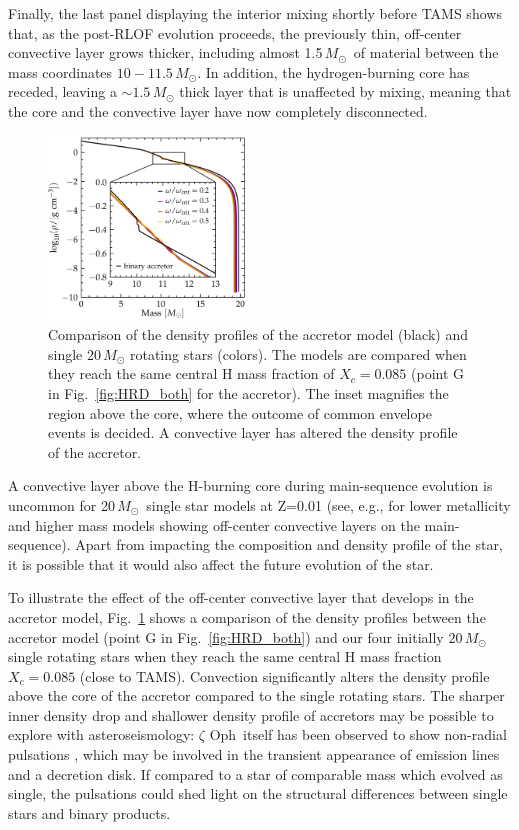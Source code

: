 \documentclass[twocolumn,twocolappendix,trackchanges]{aastex63}
\DeclareRobustCommand{\Figref}[1]{Fig.~\ref{#1}}
\newcommand{\zoph}{$\zeta$ Oph}
\newcommand{\Msun}{\ensuremath{\,M_\odot}}
\begin{document}
Finally, the last panel displaying the interior mixing shortly before
TAMS shows that, as the post-RLOF evolution proceeds, the previously
thin, off-center convective layer grows thicker, including almost
1.5\Msun\ of material between the mass coordinates $10-11.5\Msun$. In
addition, the hydrogen-burning core has receded, leaving a
$\sim 1.5\Msun$ thick layer that is unaffected by mixing, meaning
that the core and the convective layer have now completely disconnected.


\begin{figure}[tbp]
  \includegraphics[width=0.47\textwidth]{rho_comparison}
  \caption{Comparison of the density profiles of the accretor model
    (black) and single $20\,M_\odot$ rotating stars (colors). The
    models are compared when they reach the same central H mass
    fraction of $X_c=0.085$ (point G in \Figref{fig:HRD_both} for the
    accretor). The inset magnifies the region above the core, where
    the outcome of common envelope events is decided. A convective layer has altered the density profile of the accretor.}
  \label{fig:rho}
\end{figure}

A convective layer above the H-burning core
during main-sequence evolution is uncommon for 20\Msun\ single star
models at Z=0.01 (see, e.g.,  \citealt{schootemeijer:19} for lower metallicity
and higher mass models showing off-center convective layers on the
main-sequence). Apart from impacting the composition and density
profile of the star, it is possible that it would also affect the
future evolution of the star.

To illustrate the effect of the off-center convective layer that develops in the accretor model,
\Figref{fig:rho} shows a comparison of the density profiles between
the accretor model (point G in \Figref{fig:HRD_both}) and our four
initially $20\,M_\odot$ single rotating stars when they reach the same
central H mass fraction $X_c=0.085$ (close to TAMS). Convection
significantly alters the density profile above the core of the
accretor compared to the single rotating stars. The sharper inner density drop and
shallower density profile of accretors may be possible to explore with
asteroseismology: \zoph\ itself has been observed to show non-radial
pulsations \citep{walker:05}, which may be involved in the transient
appearance of emission lines and a decretion disk. If compared to a
star of comparable mass which evolved as single, the pulsations could
shed light on the structural differences between single stars and
binary products.
\end{document}
